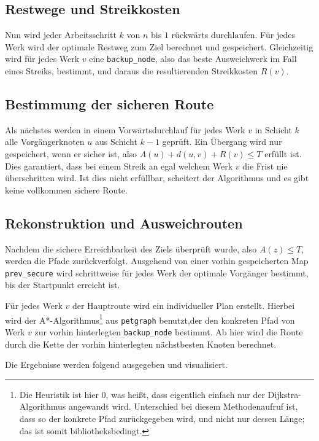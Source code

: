 \documentclass[a4paper,10pt,ngerman]{scrartcl}
\begin{document}
    \subsection{Restwege und Streikkosten}
    Nun wird jeder Arbeitsschritt $k$ von $n$ bis $1$ rückwärts durchlaufen. Für jedes Werk wird der optimale
    Restweg zum Ziel berechnet und gespeichert. Gleichzeitig wird für jedes Werk $v$ eine \texttt{backup\_node}, also
    das beste Ausweichwerk im Fall eines Streiks, bestimmt, und daraus die resultierenden Streikkosten $R(v)$.

    \subsection{Bestimmung der sicheren Route}
    Als nächstes werden in einem Vorwärtsdurchlauf für jedes Werk $v$ in Schicht $k$ alle Vorgängerknoten $u$ aus
    Schicht $k - 1$ geprüft. Ein Übergang wird nur gespeichert, wenn er sicher ist, also $A(u) + d(u,v) + R(v) \leq T$
    erfüllt ist. Dies garantiert, dass bei einem Streik an egal welchem Werk $v$ die Frist nie überschritten wird.
    Ist dies nicht erfüllbar, scheitert der Algorithmus und es gibt keine vollkommen sichere Route.

    \subsection{Rekonstruktion und Ausweichrouten}
    Nachdem die sichere Erreichbarkeit des Ziels überprüft wurde, also $A(z) \leq T$, werden die Pfade zurückverfolgt.
    Ausgehend von einer vorhin gespeicherten Map \texttt{prev\_secure} wird schrittweise für jedes Werk der optimale
    Vorgänger bestimmt, bis der Startpunkt erreicht ist.

    Für jedes Werk $v$ der Hauptroute wird ein individueller Plan erstellt. Hierbei wird der A*-Algorithmus\footnote{
    Die Heuristik ist hier 0, was heißt, dass eigentlich einfach nur der Dijkstra-Algorithmus angewandt wird.
        Unterschied bei diesem Methodenaufruf ist, dass so der konkrete Pfad zurückgegeben wird, und nicht nur dessen
        Länge; das ist somit bibliotheksbedingt.
    }
    aus \texttt{petgraph} benutzt,der den konkreten Pfad von Werk $v$ zur vorhin hinterlegten \texttt{backup\_node}
    bestimmt. Ab hier wird die Route durch die Kette der vorhin hinterlegten nächstbesten Knoten berechnet.

    Die Ergebnisse werden folgend ausgegeben und visualisiert.
\end{document}
